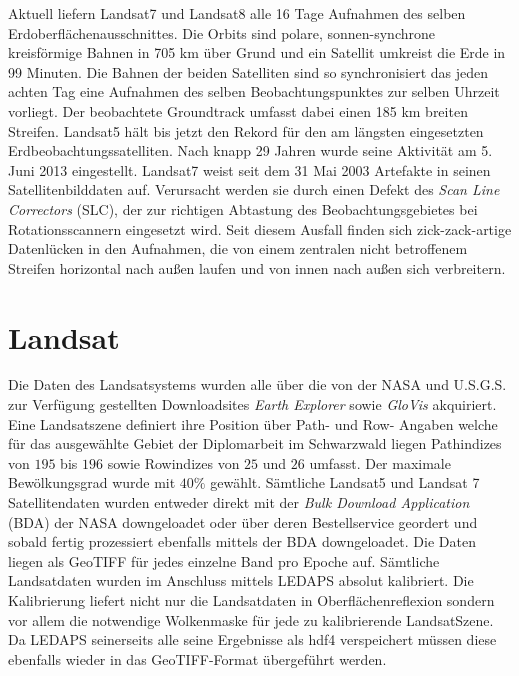 \documentclass[11pt]{report}
\begin{document}
Aktuell liefern Landsat7  und Landsat8  alle 16 Tage Aufnahmen des selben Erdoberflächenausschnittes. Die Orbits sind polare, sonnen-synchrone kreisförmige Bahnen in 705 km über Grund und ein Satellit umkreist die Erde in 99 Minuten. Die Bahnen der beiden Satelliten sind so synchronisiert das jeden achten Tag eine Aufnahmen des selben Beobachtungspunktes zur selben Uhrzeit vorliegt. Der beobachtete Groundtrack umfasst dabei einen 185 km breiten Streifen.  Landsat5 hält bis jetzt den Rekord für den am längsten eingesetzten Erdbeobachtungssatelliten. Nach knapp 29 Jahren wurde seine Aktivität am 5. Juni 2013 eingestellt. Landsat7 weist seit dem 31 Mai 2003 Artefakte in seinen Satellitenbilddaten auf. Verursacht werden sie durch einen Defekt des \textit{Scan Line Correctors} (SLC), der zur richtigen Abtastung des Beobachtungsgebietes bei Rotationsscannern eingesetzt wird. Seit diesem Ausfall finden sich zick-zack-artige Datenlücken in den Aufnahmen, die von einem zentralen nicht betroffenem Streifen horizontal nach außen laufen und von innen nach außen sich verbreitern.

\section{Landsat}
Die Daten des Landsatsystems wurden alle über die von der NASA und U.S.G.S. zur Verfügung gestellten Downloadsites \textit{Earth Explorer} sowie \textit{GloVis} akquiriert. Eine Landsatszene definiert ihre Position über Path- und Row- Angaben welche für das ausgewählte Gebiet der Diplomarbeit im Schwarzwald liegen Pathindizes von $195$ bis $196$ sowie Rowindizes von $25$ und $26$ umfasst. Der maximale Bewölkungsgrad wurde mit $40\%$ gewählt. Sämtliche Landsat5 und Landsat 7 Satellitendaten wurden entweder direkt mit der \textit{Bulk Download Application} (BDA) der NASA downgeloadet oder über deren Bestellservice geordert und sobald fertig prozessiert ebenfalls mittels der BDA downgeloadet.
Die Daten liegen als GeoTIFF für jedes einzelne Band pro Epoche auf. Sämtliche Landsatdaten wurden im Anschluss mittels LEDAPS absolut kalibriert. Die Kalibrierung liefert nicht nur die Landsatdaten in Oberflächenreflexion sondern vor allem die notwendige Wolkenmaske für jede zu kalibrierende LandsatSzene. Da LEDAPS seinerseits alle seine Ergebnisse  als hdf4 verspeichert müssen diese ebenfalls wieder in das GeoTIFF-Format übergeführt werden.
\end{document}
